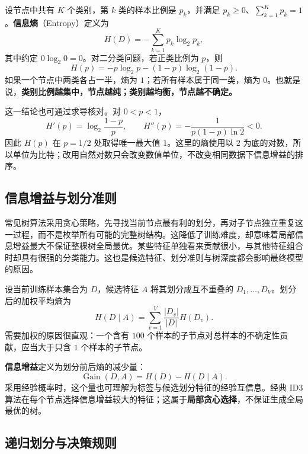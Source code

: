 设节点中共有 $K$ 个类别，第 $k$ 类的样本比例是 $p_k$，并满足 $p_k\geq0$、$\sum_{k=1}^{K}p_k=1$。\textbf{信息熵}（Entropy）定义为
\begin{equation}\label{eq:tree-entropy}
H(D)=-\sum_{k=1}^{K}p_k\log_2p_k,
\end{equation}
其中约定 $0\log_2 0=0$。对二分类问题，若正类比例为 $p$，则
\begin{equation}\label{eq:binary-entropy}
H(p)=-p\log_2p-(1-p)\log_2(1-p).
\end{equation}
如果一个节点中两类各占一半，熵为 $1$；若所有样本属于同一类，熵为 $0$。也就是说，\textbf{类别比例越集中，节点越纯；类别越均衡，节点越不确定。}

这一结论也可通过求导核对。对 $0<p<1$，
\[
H'(p)=\log_2\frac{1-p}{p},\qquad
H''(p)=-\frac1{p(1-p)\ln2}<0.
\]
因此 $H(p)$ 在 $p=1/2$ 处取得唯一最大值 $1$。这里的熵使用以 $2$ 为底的对数，所以单位为比特；改用自然对数只会改变数值单位，不改变相同数据下信息增益的排序。

\subsection{信息增益与划分准则}

常见树算法采用贪心策略，先寻找当前节点最有利的划分，再对子节点独立重复这一过程，而不是枚举所有可能的完整树结构。这降低了训练难度，却意味着局部信息增益最大不保证整棵树全局最优。某些特征单独看来贡献很小，与其他特征组合时却具有很强的分类能力。这也是候选特征、划分准则与树深度都会影响最终模型的原因。

设当前训练样本集合为 $D$，候选特征 $A$ 将其划分成互不重叠的 $D_1,\ldots,D_V$。划分后的加权平均熵为
\begin{equation}\label{eq:tree-conditional-entropy}
H(D\mid A)=\sum_{v=1}^{V}\frac{|D_v|}{|D|}H(D_v).
\end{equation}
需要加权的原因很直观：一个含有 $100$ 个样本的子节点对总样本的不确定性贡献，应当大于只含 $1$ 个样本的子节点。

\textbf{信息增益}定义为划分前后熵的减少量：
\begin{equation}\label{eq:information-gain}
\operatorname{Gain}(D,A)=H(D)-H(D\mid A).
\end{equation}
采用经验概率时，这个量也可理解为标签与候选划分特征的经验互信息。经典 ID3 算法在每个节点选择信息增益较大的特征；这属于\textbf{局部贪心选择}，不保证生成全局最优的树。

\subsection{递归划分与决策规则}

